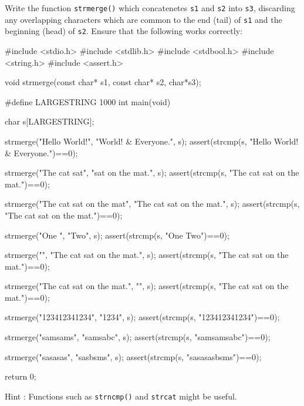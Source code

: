 
\toohard 

\begin{exercise}
Write the function \verb^strmerge()^ which concatenetes \verb^s1^ and \verb^s2^ into \verb^s3^,
discarding any overlapping characters which are common to the end (tail) of \verb^s1^ and the 
beginning (head) of \verb^s2^.
Ensure that the following
works correctly:
\begin{codesnippet}
#include <stdio.h>
#include <stdlib.h>
#include <stdbool.h>
#include <string.h>
#include <assert.h>

void strmerge(const char* s1, const char* s2, char*s3);

#define LARGESTRING 1000
int main(void)
{

   char s[LARGESTRING];

   strmerge("Hello World!", "World! & Everyone.", s);
   assert(strcmp(s, "Hello World! & Everyone.")==0);

   strmerge("The cat sat", "sat on the mat.", s);
   assert(strcmp(s, "The cat sat on the mat.")==0);

   strmerge("The cat sat on the mat", "The cat sat on the mat.", s);
   assert(strcmp(s, "The cat sat on the mat.")==0);

   strmerge("One ", "Two", s);
   assert(strcmp(s, "One Two")==0);

   strmerge("", "The cat sat on the mat.", s);
   assert(strcmp(s, "The cat sat on the mat.")==0);

   strmerge("The cat sat on the mat.", "", s);
   assert(strcmp(s, "The cat sat on the mat.")==0);

   strmerge("123412341234", "1234", s);
   assert(strcmp(s, "123412341234")==0);

   strmerge("samsams", "samsabc", s);
   assert(strcmp(s, "samsamsabc")==0);

   strmerge("sasasas", "sasbsms", s);
   assert(strcmp(s, "sasasasbsms")==0);

   return 0;
}
\end{codesnippet}
Hint : Functions such as \verb^strncmp()^ and \verb^strcat^ might be useful.
\end{exercise}
